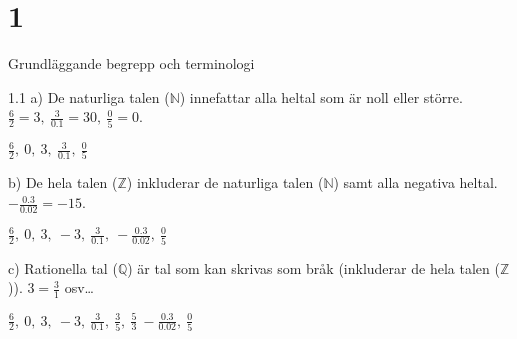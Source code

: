 \chapter{1}{Grundläggande begrepp och terminologi}

\begin{task}{1.1 a)}
	De naturliga talen ($\mathbb{N}$) innefattar alla heltal som är noll eller större. $\tfrac{6}{2}=3,~\tfrac{3}{0.1}=30,~\tfrac{0}{5}=0$.
	
	\ans $\frac{6}{2},~0,~3,~\frac{3}{0.1},~\frac{0}{5}$
\end{task}

\begin{task}{b)}
	De hela talen ($\mathbb{Z}$) inkluderar de naturliga talen ($\mathbb{N}$) samt alla negativa heltal. $-\frac{0.3}{0.02}=-15$.

	\ans $\frac{6}{2},~0,~3,~-3,~\frac{3}{0.1},~-\frac{0.3}{0.02},~\frac{0}{5}$
\end{task}

\begin{task}{c)}
	Rationella tal ($\mathbb{Q}$) är tal som kan skrivas som bråk (inkluderar de hela talen ($\mathbb{Z}$)). $3=\frac{3}{1}$ osv\ldots
	
	\ans $\frac{6}{2},~0,~3,~-3,~\frac{3}{0.1},~\frac{3}{5},~\frac{5}{3}~-\frac{0.3}{0.02},~\frac{0}{5}$
\end{task}